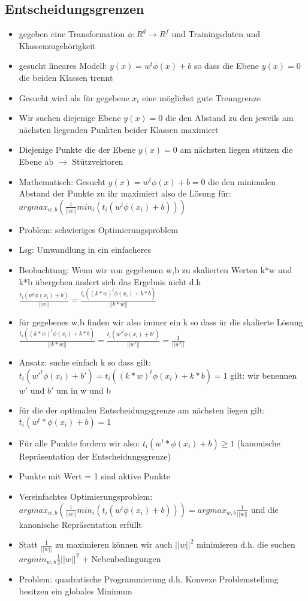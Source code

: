 \documentclass{article} %
\begin{document}
	\subsection{Entscheidungsgrenzen}
	\begin{itemize}
		\item gegeben eine Transformation $\phi: R^d \rightarrow R^f$ und Trainingsdaten und Klassenzugehörigkeit
		\item gesucht lineares Modell: $y(x) = w^t\phi(x)+b$ so dass die Ebene $y(x) = 0$ die beiden Klassen trennt
		\item Gesucht wird als für gegebene $x_i$ eine möglichst gute Trenngrenze
		\item Wir suchen diejenige Ebene $y(x) = 0$ die den Abstand zu den jeweils am nächsten liegenden Punkten beider Klassen maximiert
		\item Diejenige Punkte die der Ebene $y(x) = 0$ am nächsten liegen stützen die Ebene ab $\rightarrow$ Stützvektoren
		\item Mathematisch: Gesucht $y(x) = w^t\phi(x)+b = 0$ die den minimalen Abstand der Punkte zu ihr maximiert also de Lösung für: $argmax_{w,b}(\frac{1}{||w||}min_i(t_i(w^t\phi(x_i)+b)))$
		\item Problem: schwieriges Optimierungsproblem
		\item Lsg: Umwandlung in ein einfacheres
		\item Beobachtung: Wenn wir von gegebenen w,b zu skalierten Werten k*w und k*b übergehen ändert sich das Ergebnis nicht d.h $\frac{t_i(w^t\phi(x_i)+b)}{||w||} = \frac{t_i((k*w)^t\phi(x_i)+k*b)}{||k*w||}$
		\item für gegebenes w,b finden wir also immer ein k so dass ür die skalierte Lösung $\frac{t_i((k*w)^t\phi(x_i)+k*b)}{||k*w||} = \frac{t_i(w'^t\phi(x_i)+b')}{||w'||} = \frac{1}{||w'||}$
		\item Ansatz: suche einfach k so dass gilt:$t_i(w'^t\phi(x_i)+b') = t_i((k*w)^t\phi(x_i)+k*b)=1$ gilt: wir benennen $w'$ und $b'$ um in w und b
		\item für die der optimalen Entscheidungsgrenze am nächsten liegen gilt: $t_i(w^t*\phi(x_i)+b) = 1$
		\item Für alle Punkte fordern wir also: $t_i(w^t*\phi(x_i)+b) \geq 1$ (kanonische Repräsentation der Entscheidungsgrenze)
		\item Punkte mit Wert = 1 sind aktive Punkte
		\item Vereinfachtes Optimierungsproblem: $argmax_{w,b}(\frac{1}{||w||}min_i(t_i(w^t\phi(x_i)+b))) = argmax_{w,b} \frac{1}{||w||}$ und die kanonische Repräsentation erfüllt
		\item Statt $\frac{1}{||w||}$ zu maximieren können wir auch $||w||^2$ minimieren d.h. die suchen $argmin_{w,b} \frac{1}{2}||w||^2$ + Nebenbedingungen
		\item Problem: quadratische Programmierung d.h. Konvexe Problemstellung besitzen ein globales Minimum
	\end{itemize}
\end{document}
